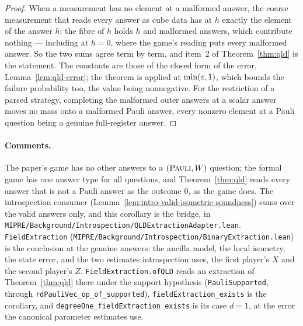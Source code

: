 \begin{proof}
\leanok
When a measurement has no element at a malformed answer, the coarse measurement that reads every
answer as cube data has at $h$ exactly the element of the answer $h$: the fibre of $h$ holds $h$
and malformed answers, which contribute nothing --- including at $h = 0$, where the game's reading
puts every malformed answer. So the two sums agree term by term, and item~2 of
Theorem~\ref{thm:qld} is the statement. The constants are those of the closed form of the error,
Lemma~\ref{lem:qld-error}; the theorem is applied at $\min(\varepsilon, 1)$, which bounds the failure
probability too, the value being nonnegative. For the restriction of a parsed strategy, completing
the malformed outer answers at a scalar answer moves no mass onto a malformed Pauli answer, every
nonzero element at a Pauli question being a genuine full-register answer.
\end{proof}

\paragraph{Comments.} The paper's game has no other answers to a $(\textsc{Pauli}, W)$ question; the formal
game has one answer type for all questions, and Theorem~\ref{thm:qld} reads every answer that is
not a Pauli answer as the outcome $0$, as the game does. The introspection consumer
(Lemma~\ref{lem:intro-valid-isometric-soundness}) sums over the valid answers only, and this
corollary is the bridge, in \texttt{MIPRE/Background/Introspection/QLDExtractionAdapter.lean}.
\texttt{FieldExtraction} (\texttt{MIPRE/Background/Introspection/BinaryExtraction.lean}) is the
conclusion at the genuine answers: the ancilla model, the local isometry, the state error, and the
two estimates introspection uses, the first player's $X$ and the second player's $Z$.
\texttt{FieldExtraction.ofQLD} reads an extraction of Theorem~\ref{thm:qld} there under the support
hypothesis (\texttt{PauliSupported}, through \texttt{rdPauliVec\_op\_of\_supported}),
\texttt{fieldExtraction\_exists} is the corollary, and \texttt{degreeOne\_fieldExtraction\_exists}
is its case $d = 1$, at the error the canonical parameter estimates use.

